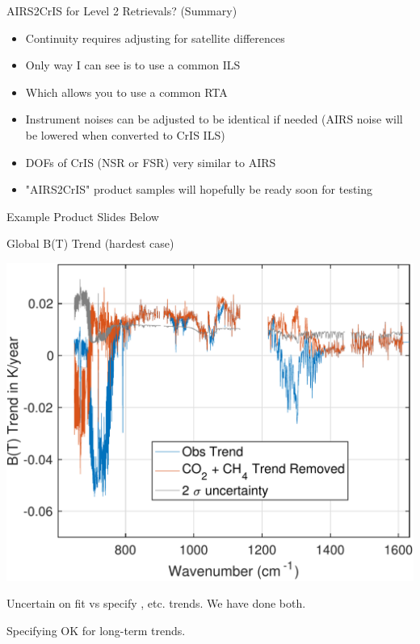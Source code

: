 \documentclass[10pt,t]{beamer}
\begin{document}
\begin{frame}[label={sec:org7fc9b3b}]{AIRS2CrIS for Level 2 Retrievals?  (Summary)}
\begin{itemize}
\item Continuity requires adjusting for satellite differences
\item Only way I can see is to use a common ILS
\item Which allows you to use a common RTA
\item Instrument noises can be adjusted to be identical if needed (AIRS noise will be lowered when converted to CrIS ILS)
\item DOFs of CrIS (NSR or FSR) very similar to AIRS
\item "AIRS2CrIS" product samples will hopefully be ready soon for testing
\end{itemize}
\end{frame}

\begin{frame}[label={sec:org4ebbb7e}]{Example Product Slides Below}
\end{frame}
\begin{frame}[label={sec:org5300dbf}]{Global B(T) Trend (hardest case)}
\vspace{-0.15in}
\begin{center}
\includegraphics[width=0.8\linewidth]{./oFigs/airs_14year_global_trends.pdf}
\end{center}

\small
Uncertain on fit vs specify \cd, \methane etc. trends. We have done both.

Specifying OK for long-term trends.  
\end{frame}
\end{document}
